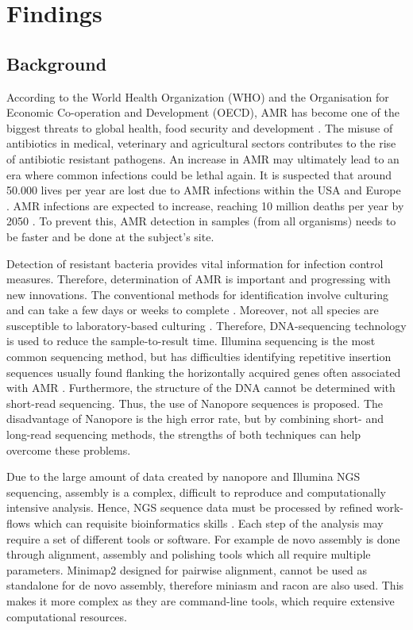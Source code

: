 \documentclass[a4paper,num-refs]{oup-contemporary}
\begin{document}
\section{Findings}
\subsection{Background}
According to the World Health Organization (WHO) and the Organisation for Economic Co-operation and Development (OECD), AMR has become one of the biggest threats to global health, food security and development \cite{OrganisationforEconomicCo-operationandDevelopment2017, WorldHealthOrganization2018}. The misuse of antibiotics in medical, veterinary and agricultural sectors contributes to the rise of antibiotic resistant pathogens. An increase in AMR may ultimately lead to an era where common infections could be lethal again. It is suspected that around 50.000 lives per year are lost due to AMR infections within the USA and Europe \cite{Simlai2016}. AMR infections are expected to increase, reaching 10 million deaths per year by 2050 \cite{ONeil2014}. To prevent this, AMR detection in samples (from all organisms) needs to be faster and be done at the subject's site. 

Detection of resistant bacteria provides vital information for infection control measures. Therefore, determination of AMR is important and progressing with new innovations. The conventional methods for identification involve culturing and can take a few days or weeks to complete \cite{Quick2015}. Moreover, not all species are susceptible to laboratory-based culturing \cite{Mitsuhashi2017}. Therefore, DNA-sequencing technology is used to reduce the sample-to-result time. Illumina sequencing is the most common sequencing method, but has difficulties identifying repetitive insertion sequences usually found flanking the horizontally acquired genes often associated with AMR \cite{Ashton2014}. Furthermore, the structure of the DNA cannot be determined with short-read sequencing. Thus, the use of Nanopore sequences is proposed. The disadvantage of Nanopore is the high error rate, but by combining short- and long-read sequencing methods, the strengths of both techniques can help overcome these problems.

Due to the large amount of data created by nanopore and Illumina NGS sequencing, assembly is a complex, difficult to reproduce and computationally intensive analysis. Hence, NGS sequence data must be processed by refined work-flows which can requisite bioinformatics skills \cite{Hemlata2016}. Each step of the analysis may require a set of different tools or software. For example de novo assembly is done through alignment, assembly and polishing tools which all require multiple parameters. Minimap2 designed for pairwise alignment, cannot be used as standalone for de novo assembly, therefore miniasm and racon are also used. This makes it more complex as they are command-line tools, which require extensive computational resources. 
\end{document}
